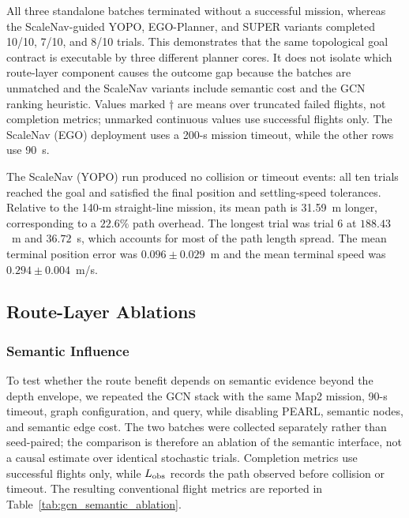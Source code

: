 \documentclass[letterpaper,10pt,conference]{ieeeconf}
\begin{document}
All three standalone batches terminated without a successful mission, whereas
the ScaleNav-guided YOPO, EGO-Planner, and SUPER variants completed 10/10,
7/10, and 8/10 trials.  This demonstrates that the same topological goal
contract is executable by three different planner cores.  It does not isolate
which route-layer component causes the outcome gap because the batches are
unmatched and the ScaleNav variants include semantic cost and the GCN ranking
heuristic.  Values marked $\dagger$ are means over truncated failed flights,
not completion metrics; unmarked continuous values use successful flights
only.  The ScaleNav (EGO) deployment uses a 200-s mission timeout, while the
other rows use 90~s.

The ScaleNav (YOPO) run produced no collision or timeout events: all ten trials
reached the goal and satisfied the final position and settling-speed
tolerances.  Relative to the 140-m straight-line mission, its mean path is
31.59~m longer, corresponding to a $22.6\%$ path overhead.  The longest trial
was trial 6 at $188.43$~m and $36.72$~s, which accounts for most of the path
length spread.  The mean terminal position error was $0.096\pm0.029$~m and
the mean terminal speed was $0.294\pm0.004$~m/s.

\subsection{Route-Layer Ablations}
\subsubsection{Semantic Influence}
To test whether the route benefit depends on semantic evidence beyond the
depth envelope, we repeated the GCN stack with the same Map2 mission,
90-s timeout, graph configuration, and query, while disabling PEARL,
semantic nodes, and semantic edge cost.  The two batches were collected
separately rather than seed-paired; the comparison is therefore an ablation
of the semantic interface, not a causal estimate over identical stochastic
trials.  Completion metrics use successful flights only, while $L_{\rm obs}$
records the path observed before collision or timeout.  The resulting
conventional flight metrics are reported in Table~\ref{tab:gcn_semantic_ablation}.
\end{document}
